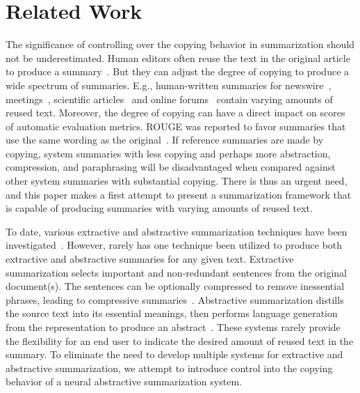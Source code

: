 \documentclass[letterpaper]{article} %
\begin{document}
\section{Related Work}
\label{sec:related}

The significance of controlling over the copying behavior in summarization should not be underestimated.
Human editors often reuse the text in the original article to produce a summary~\cite{Jing:1999}.
But they can adjust the degree of copying to produce a wide spectrum of summaries.
E.g., human-written summaries for newswire~\cite{Over:2004,Hermann:2015}, meetings~\cite{Carletta:2005,Liu:2013:IEEETrans}, scientific articles~\cite{Qazvinian:2013} and online forums~\cite{Ouyang:2017} contain varying amounts of reused text. 
Moreover, the degree of copying can have a direct impact on scores of automatic evaluation metrics.
ROUGE was reported to favor summaries that use the same wording as the original~\cite{Ng:2015}.
If reference summaries are made by copying, system summaries with less copying and perhaps more abstraction, compression, and paraphrasing will be disadvantaged when compared against other system summaries with substantial copying.   
There is thus an urgent need, and this paper makes a first attempt to present a summarization framework that is capable of producing summaries with varying amounts of reused text. 


To date, various extractive and abstractive summarization techniques have been investigated~\cite{Nenkova:2011}.
However, rarely has one technique been utilized to produce both extractive and abstractive summaries for any given text. 
Extractive summarization selects important and non-redundant sentences from the original document(s).
The sentences can be optionally compressed to remove inessential phrases, leading to compressive summaries~\cite{Martins:2009,Li:2013:EMNLP,Wang:2013,Filippova:2015,Durrett:2016}.
Abstractive summarization distills the source text into its essential meanings, then performs language generation from the representation to produce an abstract~\cite{Barzilay:2005,Liu:2015:NAACL,Liao:2018,Hardy:2018}.
These systems rarely provide the flexibility for an end user to indicate the desired amount of reused text in the summary.
To eliminate the need to develop multiple systems for extractive and abstractive summarization, 
we attempt to introduce control into the copying behavior of a neural abstractive summarization system.
\end{document}
